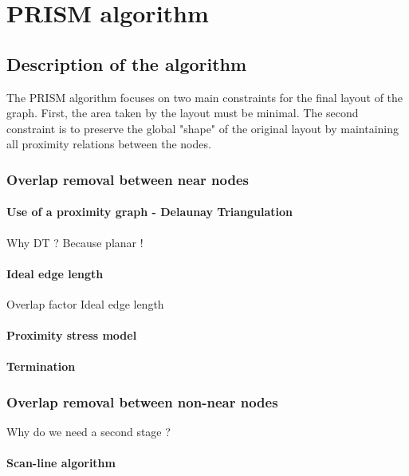 \documentclass[12pt]{report}
\begin{document}
\chapter{PRISM algorithm}

\section{Description of the algorithm}

The PRISM algorithm focuses on two main constraints for the final layout of the graph. First, the area taken by the layout must be minimal. The second constraint is to preserve the global "shape" of the original layout by maintaining all proximity relations between the nodes.

\subsection{Overlap removal between near nodes}
\subsubsection{Use of a proximity graph - Delaunay Triangulation}
Why DT ? Because planar !

\subsubsection{Ideal edge length}
Overlap factor
Ideal edge length

\subsubsection{Proximity stress model}

\subsubsection{Termination}

\subsection{Overlap removal between non-near nodes}

Why do we need a second stage ?
\subsubsection{Scan-line algorithm}
\end{document}

